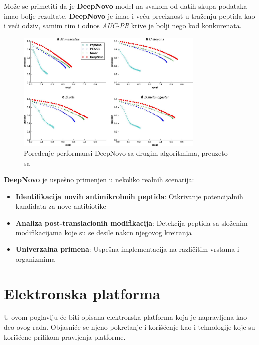 \documentclass[12pt,oneside]{memoir}
\begin{document}
Može se primetiti da je \textbf{DeepNovo} model na svakom od datih skupa podataka imao bolje rezultate. \textbf{DeepNovo} je imao i veću preciznost u traženju peptida kao i veći odziv, samim tim i odnos \emph{AUC-PR} krive je bolji nego kod konkurenata.

\begin{figure}[h]
\centering
\includegraphics[width=0.8\textwidth]{images/deep_novo_comparison.jpeg}
\caption{Poređenje performansi DeepNovo sa drugim algoritmima, preuzeto sa \cite{deepnovo}}
\label{fig:performanse}
\end{figure}

\textbf{DeepNovo} je uspešno primenjen u nekoliko realnih scenarija:

\begin{itemize}
\item \textbf{Identifikacija novih antimikrobnih peptida}: Otkrivanje potencijalnih kandidata za nove antibiotike
\item \textbf{Analiza post-translacionih modifikacija}: Detekcija peptida sa složenim modifikacijama koje su se desile nakon njegovog kreiranja
\item \textbf{Univerzalna primena}: Uspešna implementacija na različitim vrstama i organizmima
\end{itemize}


\chapter{Elektronska platforma}

U ovom poglavlju će biti opisana elektronska platforma koja je napravljena kao deo ovog rada. Objasniće se njeno pokretanje i korišćenje kao i tehnologije koje su korišćene prilikom pravljenja platforme.
\end{document}
